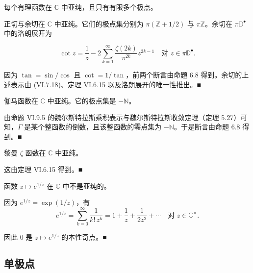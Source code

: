 \begin{example}

\begin{items}
\item

每个有理函数在 $ \mathbb{C} $ 中亚纯，且只有有限多个极点。

\item

正切与余切在 $ \mathbb{C} $ 中亚纯。它们的极点集分别为 $ \pi(\mathbb{Z} + 1/2) $ 与 $ \pi\mathbb{Z} $。余切在 $ \pi\mathbb{D}^{\bullet} $ 中的洛朗展开为

\[
\cot z = \frac{1}{z} - 2\sum_{k=1}^{\infty}\frac{\zeta(2k)}{\pi^{2k}}z^{2k-1} \quad \text{对 } z \in \pi\mathbb{D}^{\bullet} .
\]

\proofhead
因为 $ \tan = \sin/\cos $ 且 $ \cot = 1/\tan $，前两个断言由命题 6.8 得到。余切的上述表示由 (VI.7.18)、定理 VI.6.15 以及洛朗展开的唯一性推出。\nobreak\hspace{0.35em}■
\item

伽马函数在 $ \mathbb{C} $ 中亚纯。它的极点集是 $ -\mathbb{N} $。

\proofhead
由命题 VI.9.5 的魏尔斯特拉斯乘积表示与魏尔斯特拉斯收敛定理（定理 5.27）可知，$ \Gamma $ 是某个整函数的倒数，且该整函数的零点集为 $ -\mathbb{N} $。于是断言由命题 6.8 得到。\nobreak\hspace{0.35em}■
\item

黎曼 $ \zeta $ 函数在 $ \mathbb{C} $ 中亚纯。

\proofhead
这由定理 VI.6.15 得到。\nobreak\hspace{0.35em}■
\item

函数 $ z \mapsto e^{1/z} $ 在 $ \mathbb{C} $ 中不是亚纯的。

\proofhead
因为 $ e^{1/z} = \exp(1/z) $，有
\[
e^{1/z} = \sum_{k=0}^{\infty}\frac{1}{k!\,z^{k}} = 1 + \frac{1}{z} + \frac{1}{2z^{2}} + \cdots \quad \text{对 } z \in \mathbb{C}^{\times} .
\]

因此 $ 0 $ 是 $ z \mapsto e^{1/z} $ 的本性奇点。\nobreak\hspace{0.35em}■

\end{items}

\end{example}

\subsection*{单极点}

